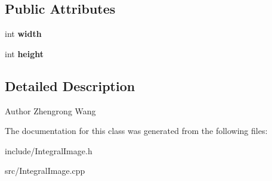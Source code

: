 \subsection*{Public Attributes}
\begin{DoxyCompactItemize}
\item 
\hypertarget{classIntegralImage_a0e48dfba6ab1a43b7df5944272fa125a}{}int {\bfseries width}\label{classIntegralImage_a0e48dfba6ab1a43b7df5944272fa125a}

\item 
\hypertarget{classIntegralImage_aa3a261ce530a860004fb057881f83782}{}int {\bfseries height}\label{classIntegralImage_aa3a261ce530a860004fb057881f83782}

\end{DoxyCompactItemize}


\subsection{Detailed Description}
\begin{DoxyAuthor}{Author}
Zhengrong Wang 
\end{DoxyAuthor}


The documentation for this class was generated from the following files\+:\begin{DoxyCompactItemize}
\item 
include/Integral\+Image.\+h\item 
src/Integral\+Image.\+cpp\end{DoxyCompactItemize}
